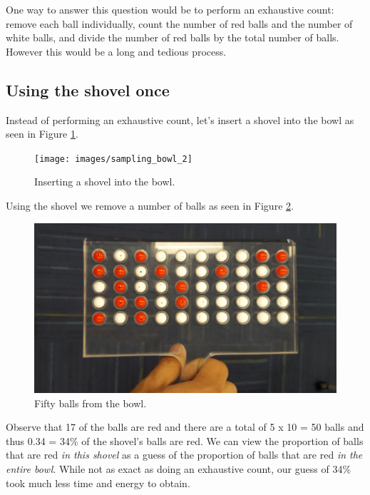 \documentclass[12pt, krantz2,]{krantz}
\begin{document}
One way to answer this question would be to perform an exhaustive count: remove each ball individually, count the number of red balls and the number of white balls, and divide the number of red balls by the total number of balls. However this would be a long and tedious process.

\hypertarget{using-the-shovel-once}{%
\subsection{Using the shovel once}\label{using-the-shovel-once}}

Instead of performing an exhaustive count, let's insert a shovel into the bowl as seen in Figure \ref{fig:sampling-exercise-2}.

\begin{figure}

{\centering \texttt{[image: images/sampling\_bowl\_2]} 

}

\caption{Inserting a shovel into the bowl.}\label{fig:sampling-exercise-2}
\end{figure}

Using the shovel we remove a number of balls as seen in Figure \ref{fig:sampling-exercise-3}.

\begin{figure}

{\centering \includegraphics[width=0.8\linewidth]{images/sampling_bowl_3_cropped} 

}

\caption{Fifty balls from the bowl.}\label{fig:sampling-exercise-3}
\end{figure}

Observe that 17 of the balls are red and there are a total of 5 x 10 = 50 balls and thus 0.34 = 34\% of the shovel's balls are red. We can view the proportion of balls that are red \emph{in this shovel} as a guess of the proportion of balls that are red \emph{in the entire bowl}. While not as exact as doing an exhaustive count, our guess of 34\% took much less time and energy to obtain.
\end{document}
